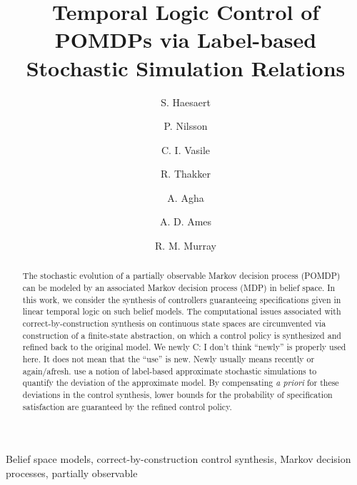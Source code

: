 \documentclass{ifacconf}
\newcommand{\cristi}[1]{{\color{olive}#1}}
\begin{document}
\begin{frontmatter}

\title{Temporal Logic Control of POMDPs via Label-based Stochastic Simulation Relations}

\author[cal]{S. Haesaert}
\author[cal]{P. Nilsson}
\author[mit]{C. I. Vasile}
\author[jpl]{R. Thakker}
\author[jpl]{A. Agha}
\author[cal]{A. D.  Ames}
\author[cal]{R. M. Murray}



\address[cal]{California Institute of Technology,
   Pasadena, CA 91125 USA} %
\address[mit]{Massachusetts Institute of Technology,
   Cambridge, MA 02139 USA}%
\address[jpl]{Jet Propulsion Laboratory,
   Pasadena, CA 91109 USA}%
\maketitle
\begin{abstract}
The stochastic evolution of a partially observable Markov decision process (POMDP) can be modeled by an associated Markov decision process (MDP) in belief space.
In this work, we consider the synthesis of controllers guaranteeing  specifications given in linear temporal logic on such belief models. The computational issues associated with correct-by-construction synthesis on continuous state spaces are circumvented via construction of a finite-state abstraction, on which a control policy is synthesized and refined back to the original model. We newly \cristi{\tiny C: I don't think ``newly'' is properly used here. It does not mean that the ``use'' is new. Newly usually means recently or again/afresh.} use  a  notion of label-based approximate stochastic simulations to quantify the deviation of the approximate model. By compensating {\it a priori} for these deviations in the control synthesis, lower bounds for the probability of specification satisfaction are guaranteed by the refined control policy.
\end{abstract}
\begin{keyword} Belief space models,
correct-by-construction control synthesis, Markov decision processes, partially observable
\end{keyword}

\end{frontmatter}
\end{document}
